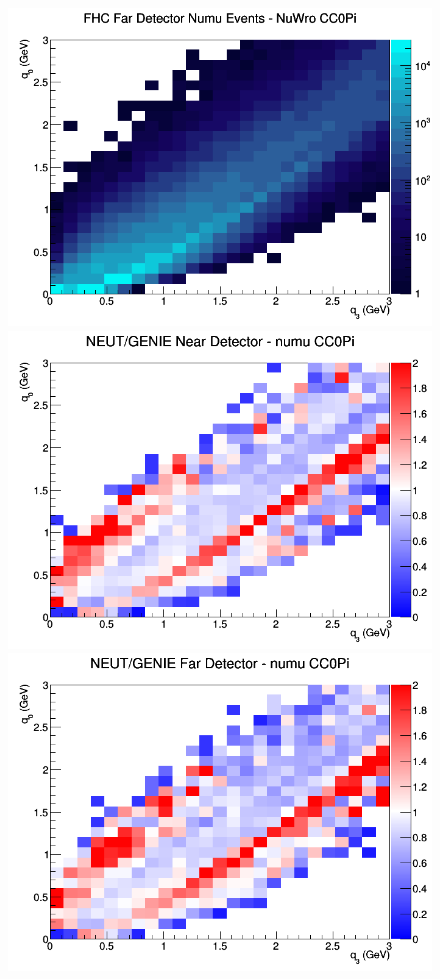 \documentclass[12pt]{article}
\begin{document}
\begin{figure}[h]
\endminipage
{}
\includegraphics[width=\linewidth]{eff_q0_q3/GAr/CC0Pi_FHC_FD_numu_q3_q0_NuWro.png}
\endminipage
\newline
{}
\includegraphics[width=\linewidth]{eff_q0_q3/GAr/ratios/CC0Pi_NEUT_GENIE_numu_near_q3_q0.png}
\endminipage
{}
\includegraphics[width=\linewidth]{eff_q0_q3/GAr/ratios/CC0Pi_NEUT_GENIE_numu_far_q3_q0.png}

\end{figure}
\end{document}
